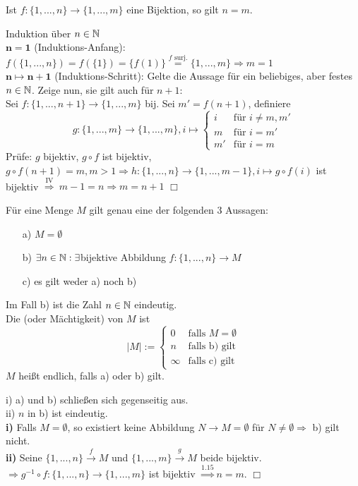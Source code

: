 \begin{satz}
	Ist $f:\{1,...,n\}\rightarrow\{1,...,m\}$ eine Bijektion, so gilt $n=m$.\
\end{satz}

\begin{bew}
	Induktion über $n\in\mathbb{N}$\\
	$\mathbf{n=1}$ (Induktions-Anfang): $f(\{1,...,n\})=f(\{1\})=\{f(1)\}\stackrel{f\text{ surj.}}{=}\{1,...,m\}\Rightarrow m=1$\\
	$\mathbf{n\mapsto n+1}$ (Induktions-Schritt): Gelte die Aussage für ein beliebiges, aber festes $n\in\mathbb{N}$. Zeige nun, sie gilt auch für $n+1$: \\
	Sei $f:\{1,...,n+1\}\rightarrow\{1,...,m\}$ bij. Sei $m'=f(n+1)$, definiere
	\[
	g:\{1,...,m\}\rightarrow\{1,...,m\}, i\mapsto
	\begin{cases}
	i & \text{für } i\neq m,m'\\
	m & \text{für } i=m'\\
	m' & \text{für } i=m
	\end{cases}
	\]
	Prüfe: $g$ bijektiv, $g\circ f$ ist bijektiv, $g\circ f(n+1)=m,m>1\Rightarrow h:\{1,...,n\}\rightarrow\{1,...,m-1\},i\mapsto g\circ f(i)$ ist bijektiv $\stackrel{\text{IV}}{\Rightarrow}\:m-1=n \Rightarrow m=n+1$ \hfill $\Box$
\end{bew}

\begin{prop}
	Für eine Menge $M$ gilt genau eine der folgenden 3 Aussagen:
	\begin{itemize}
		\item[a)] $M=\emptyset$
		\item[b)] $\exists n\in\mathbb{N}:\exists$bijektive Abbildung $f:\{1,...,n\}\rightarrow M$
		\item[c)] es gilt weder a) noch b)
	\end{itemize}
	Im Fall b) ist die Zahl $n\in\mathbb{N}$ eindeutig.\\
	Die  (oder Mächtigkeit) von $M$ ist
	\[
	|M|:=\begin{cases}
	0 & \text{falls } M=\emptyset \\
	n & \text{falls b) gilt} \\
	\infty & \text{falls c) gilt}
	\end{cases}
	\]
	$M$ heißt endlich, falls a) oder b) gilt.
\end{prop}

\begin{bew}
	i) \zz a) und b) schließen sich gegenseitig aus.\\
	ii) \zz $n$ in b) ist eindeutig.\\
	\textbf{i)} Falls $M=\emptyset$, so existiert keine Abbildung $N\rightarrow M=\emptyset$ für $N\neq\emptyset\Rightarrow$ b) gilt nicht. \\
	\textbf{ii)} Seine $\{1,...,n\}\stackrel{f}{\rightarrow} M$ und $\{1,...,m\}\stackrel{g}{\rightarrow} M$ beide bijektiv. $\Rightarrow g^{-1}\circ f:\{1,...,n\}\rightarrow\{1,...,m\}$ ist bijektiv $\stackrel{1.15}{\Rightarrow} n=m$. \hfill $\Box$
\end{bew}

